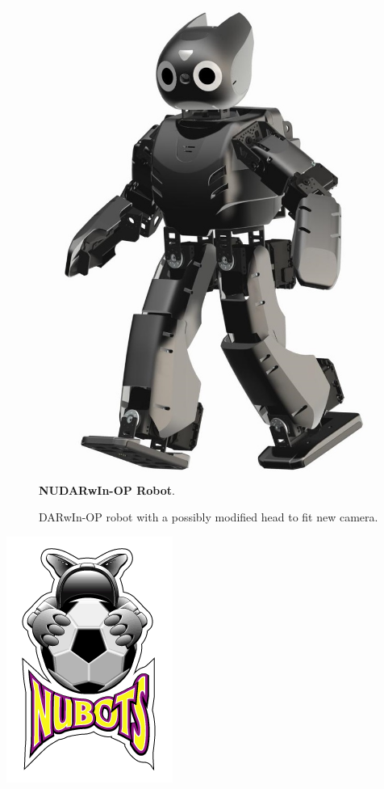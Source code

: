 \documentclass[10pt,a4paper]{article}
\begin{document}
\begin{multicols}{2}
\begin{figure}[H]
	\begin{center}
		\includegraphics[scale=0.3]{darwin.png}\\
		\textbf{NUDARwIn-OP Robot}.\\
		\begin{footnotesize}
		DARwIn-OP robot with a possibly modified head to fit new camera.
		\end{footnotesize}
	\end{center}
\end{figure}

\end{multicols}

\begin{center}
	\includegraphics[scale=0.8]{nubots_logo.png}
\end{center}
\end{document}
